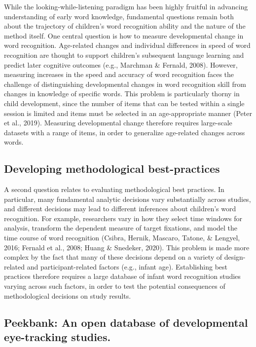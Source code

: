 \documentclass[
  english,
  man]{apa6}
\begin{document}
While the looking-while-listening paradigm has been highly fruitful in advancing understanding of early word knowledge, fundamental questions remain both about the trajectory of children's word recognition ability and the nature of the method itself. One central question is how to measure developmental change in word recognition. Age-related changes and individual differences in speed of word recognition are thought to support children's subsequent language learning and predict later cognitive outcomes (e.g., Marchman \& Fernald, 2008). However, measuring increases in the speed and accuracy of word recognition faces the challenge of distinguishing developmental changes in word recognition skill from changes in knowledge of specific words. This problem is particularly thorny in child development, since the number of items that can be tested within a single session is limited and items must be selected in an age-appropriate manner (Peter et al., 2019). Measuring developmental change therefore requires large-scale datasets with a range of items, in order to generalize age-related changes across words.

\hypertarget{developing-methodological-best-practices}{%
\subsection{Developing methodological best-practices}\label{developing-methodological-best-practices}}

A second question relates to evaluating methodological best practices. In particular, many fundamental analytic decisions vary substantially across studies, and different decisions may lead to different inferences about children's word recognition. For example, researchers vary in how they select time windows for analysis, transform the dependent measure of target fixations, and model the time course of word recognition (Csibra, Hernik, Mascaro, Tatone, \& Lengyel, 2016; Fernald et al., 2008; Huang \& Snedeker, 2020). This problem is made more complex by the fact that many of these decisions depend on a variety of design-related and participant-related factors (e.g., infant age). Establishing best practices therefore requires a large database of infant word recognition studies varying across such factors, in order to test the potential consequences of methodological decisions on study results.

\hypertarget{peekbank-an-open-database-of-developmental-eye-tracking-studies.}{%
\subsection{Peekbank: An open database of developmental eye-tracking studies.}\label{peekbank-an-open-database-of-developmental-eye-tracking-studies.}}
\end{document}
